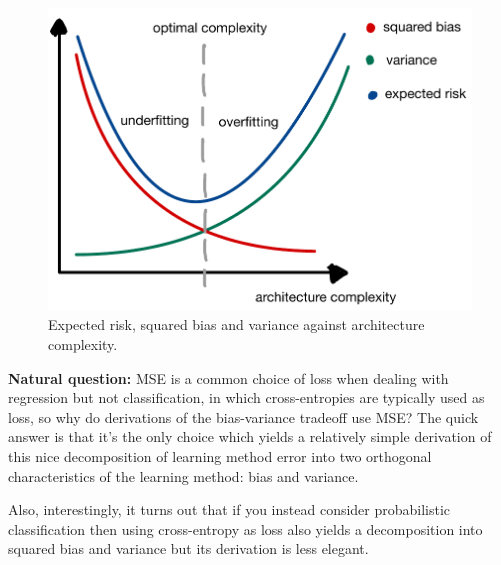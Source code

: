 \documentclass[11pt]{article}
\begin{document}
\begin{figure}[t]
    \centering
    \begin{minipage}{0.6\linewidth}
        \includegraphics[width=\linewidth]{./figures/supervised_learning/bias_variance.pdf}
    \end{minipage}%
    \hfill
    \begin{minipage}{0.35\linewidth}
        \caption{Expected risk, squared bias and variance against architecture complexity.}
        \label{fig:bias_variance}
    \end{minipage}
\end{figure}

\begin{tcolorbox}[title={\centering\textbf{Beyond MSE}}, colback=myLightBlue, colbacktitle=myDarkBlue, colframe=myDarkBlue, coltitle=white]
    \textbf{Natural question:} MSE is a common choice of loss when dealing with regression but not classification, in which cross-entropies are typically used as loss, so why do derivations of the bias-variance tradeoff use MSE? The quick answer is that it's the only choice which yields a relatively simple derivation of this nice decomposition of learning method error into two orthogonal characteristics of the learning method: bias and variance.
    
    \hspace{14.2pt} Also, interestingly, it turns out that if you instead consider probabilistic classification then using cross-entropy as loss also yields a decomposition into squared bias and variance but its derivation is less elegant.
\end{tcolorbox}
\end{document}
